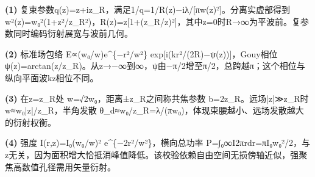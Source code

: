 \par\noindent\textbf{(1)} 复束参数q(z)=z+iz\_R，满足1/q=1/R(z)−iλ/[πw(z)²]。分离实虚部得到 w²(z)=w₀²(1+z²/z\_R²)，R(z)=z[1+(z\_R/z)²]，其中z=0时R→∞为平波前。复参数同时编码衍射展宽与波前几何。
\par\noindent\textbf{(2)} 标准场包络 E∝(w₀/w)e\textasciicircum{}\{−r²/w²\} exp[i(kr²/(2R)−ψ(z))]，Gouy相位 ψ(z)=arctan(z/z\_R)。从z→−∞到∞，ψ由−π/2增至π/2，总跨越π；这个相位与纵向平面波kz相位不同。
\par\noindent\textbf{(3)} 在z=z\_R处 w=√2w₀，距离±z\_R之间称共焦参数 b=2z\_R。远场|z|≫z\_R时 w≈w₀|z|/z\_R，半角发散 θ\_d≈w₀/z\_R=λ/(πw₀)，体现束腰越小、远场发散越大的衍射权衡。
\par\noindent\textbf{(4)} 强度 I(r,z)=I₀(w₀/w)² e\textasciicircum{}\{−2r²/w²\}，横向总功率 P=∫₀∞I2πrdr=πI₀w₀²/2，与z无关，因为面积增大恰抵消峰值降低。该校验依赖自由空间无损傍轴近似，强聚焦高数值孔径需用矢量衍射。
